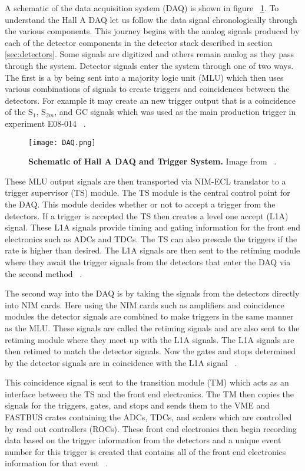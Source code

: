 A schematic of the data acquisition system (DAQ) is shown in figure ~\ref{fig:daq}. To understand the Hall A DAQ let us follow the data signal chronologically through the various components. This journey begins with the analog signals produced by each of the detector components in the detector stack described in section \ref{sec:detectors}. Some signals are digitized and others remain analog as they pass through the system. Detector signals enter the system through one of two ways. The first is a by being sent into a majority logic unit (MLU) which then uses various combinations of signals to create triggers and coincidences between the detectors. For example it may create an new trigger output that is a coincidence of the S$_1$, S$_{2m}$, and GC signals which was used as the main production trigger in experiment E08-014 ~\cite{DAQ}. 

\begin{figure}[!ht]
\begin{center}
\texttt{[image: DAQ.png]}
\end{center}
\caption{
{\bf{Schematic of Hall A DAQ and Trigger System.}} Image from ~\cite{DAQ}.}
\label{fig:daq}
\end{figure}

These MLU output signals are then transported via NIM-ECL translator to a trigger supervisor (TS) module. The TS module is the central control point for the DAQ. This module decides whether or not to accept a trigger from the detectors. If a trigger is accepted the TS then creates a level one accept (L1A) signal. These L1A signals provide timing and gating information for the front end electronics such as ADCs and TDCs. The TS can also prescale the triggers if the rate is higher than desired. The L1A signals are then sent to the retiming module where they await the trigger signals from the detectors that enter the DAQ via the second method ~\cite{DAQ}.

The second way into the DAQ is by taking the signals from the detectors directly into NIM cards. Here using the NIM cards such as amplifiers and coincidence modules the detector signals are combined to make triggers in the same manner as the MLU. These signals are called the retiming signals and are also sent to the retiming module where they meet up with the L1A signals. The L1A signals are then retimed to match the detector signals. Now the gates and stops determined by the detector signals are in coincidence with the L1A signal ~\cite{DAQ}.

This coincidence signal is sent to the transition module (TM) which acts as an interface between the TS and the front end electronics. The TM then copies the signals for the triggers, gates, and stops and sends them to the VME and FASTBUS crates containing the ADCs, TDCs, and scalers which are controlled by read out controllers (ROCs). These front end electronics then begin recording data based on the trigger information from the detectors and a unique event number for this trigger is created that contains all of the front end electronics information for that event ~\cite{DAQ}.